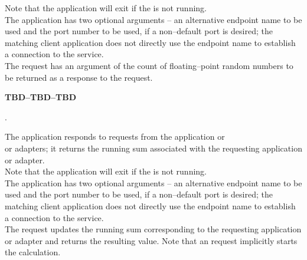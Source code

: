 Note that the application will exit if the
 is not running.\\

The application has two optional arguments -- an alternative endpoint name to be used and
the port number to be used, if a non--default port is desired; the matching client
application does not directly use the endpoint name to establish a connection to the
service.\\

The  request has an argument of the
count of floating--point random numbers to be returned as a response to the request.
%

			\begin{Large}\textbf{TBD--TBD--TBD}\end{Large}.

The  application responds to
requests from the  application or\\
 or
 adapters; it returns the running sum
associated with the requesting application or adapter.\\

Note that the application will exit if the
 is not running.\\

The application has two optional arguments -- an alternative endpoint name to be used and
the port number to be used, if a non--default port is desired; the matching client
application does not directly use the endpoint name to establish a connection to the
service.\\

The  request updates the running sum
corresponding to the requesting application or adapter and returns the resulting value.
Note that an  request implicitly starts the
calculation.\\
%

